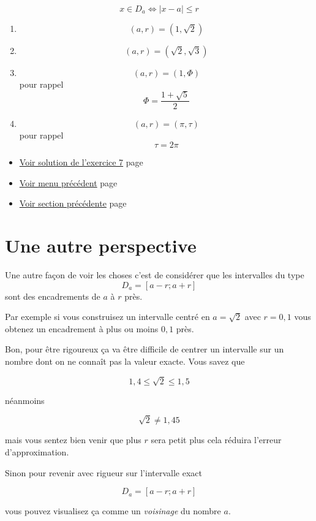 \documentclass[a4paper,11pt]{book}
\begin{document}
\[x\in D_a \iff \lvert x - a \rvert \leq r\]


\begin{enumerate}
\item \[(a, r) = (1, \sqrt{2})\]
\item \[(a, r) = (\sqrt{2}, \sqrt{3})\]
\item \[(a, r) = (1, \Phi)\] pour rappel \[\Phi = \dfrac{1 + \sqrt{5}}{2}\]
\item \[(a, r) = (\pi, \tau)\] pour rappel \[\tau = 2\pi\]
\end{enumerate}


\begin{itemize}
\item \hyperref[orgad10de5]{Voir solution de l'exercice 7}
page~\pageref{page:sec8.4.1sol7}
\item \hyperref[orgb78d1c3]{Voir menu précédent}
page~\pageref{page:content4-menu}
\item \hyperref[orgc8b3a2f]{Voir section précédente}
page~\pageref{page:sec2.4.1intro-disk}
\end{itemize}


\clearpage

\section{Une autre perspective}
\label{sec:orgb7d7842}
\label{org1f91479}
\label{page:sec2.4.3persp}

Une autre façon de voir les choses c'est de considérer que les
intervalles du type
\[D_a = [a - r ; a + r]\]
sont des encadrements de \(a\) à \(r\) près.

Par exemple si vous construisez un intervalle centré en \(a =
\sqrt{2}\) avec \(r = 0,1\) vous obtenez un encadrement à plus ou
moins \(0,1\) près.

Bon, pour être rigoureux ça va être difficile de centrer un intervalle
sur un nombre dont on ne connaît pas la valeur exacte. Vous savez que

\[1,4 \leq \sqrt{2} \leq 1,5\]

néanmoins

\[\sqrt{2} \neq 1,45\]

mais vous sentez bien venir que plus \(r\) sera petit plus cela
réduira l'erreur d'approximation.

Sinon pour revenir avec rigueur sur l'intervalle exact

\[D_a = [a - r ; a + r]\]

vous pouvez visualisez ça comme un \emph{voisinage} du nombre \(a\).
\end{document}
